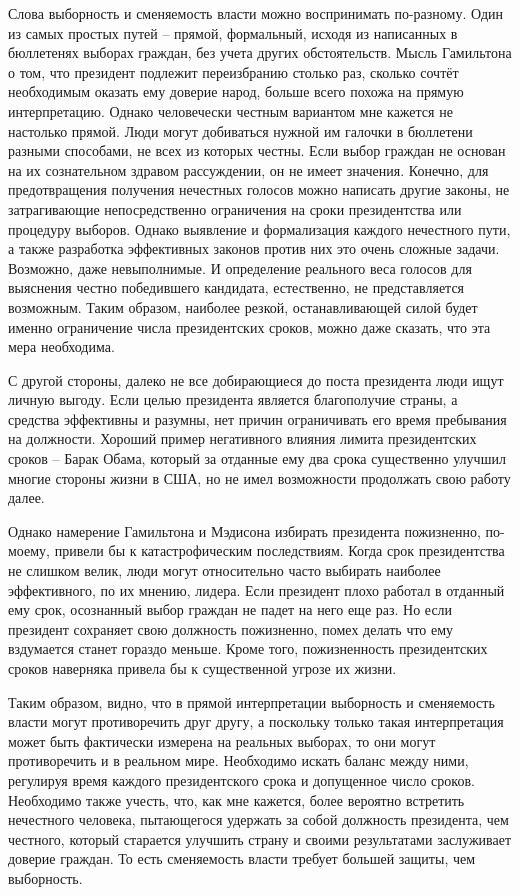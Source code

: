 \documentclass[a4paper, 12pt]{article}
\begin{document}
Слова выборность и сменяемость власти можно воспринимать по-разному. 
Один из самых простых путей -- прямой, формальный, исходя из написанных в бюллетенях выборах граждан, без учета других обстоятельств. 
Мысль Гамильтона о том, что президент подлежит переизбранию столько раз, сколько сочтёт необходимым оказать ему доверие народ, больше всего похожа на прямую интерпретацию. 
Однако человечески честным вариантом мне кажется не настолько прямой. 
Люди могут добиваться нужной им галочки в бюллетени разными способами, не всех из которых честны. 
Если выбор граждан не основан на их сознательном здравом рассуждении, он не имеет значения. 
Конечно, для предотвращения получения нечестных голосов можно написать другие законы, не затрагивающие непосредственно ограничения на сроки президентства или процедуру выборов. 
Однако выявление и формализация каждого нечестного пути, а также разработка эффективных законов против них это очень сложные задачи. 
Возможно, даже невыполнимые. 
И определение реального веса голосов для выяснения честно победившего кандидата, естественно, не представляется возможным. 
Таким образом, наиболее резкой, останавливающей силой будет именно ограничение числа президентских сроков, можно даже сказать, что эта мера необходима. 

С другой стороны, далеко не все добирающиеся до поста президента люди ищут личную выгоду.
Если целью президента является благополучие страны, а средства эффективны и разумны, нет причин ограничивать его время пребывания на должности. 
Хороший пример негативного влияния лимита президентских сроков -- Барак Обама, который за отданные ему два срока существенно улучшил многие стороны жизни в США, но не имел возможности продолжать свою работу далее. 

Однако намерение Гамильтона и Мэдисона избирать президента пожизненно, по-моему, привели бы к катастрофическим последствиям. 
Когда срок президентства не слишком велик, люди могут относительно часто выбирать наиболее эффективного, по их мнению, лидера. 
Если президент плохо работал в отданный ему срок, осознанный выбор граждан не падет на него еще раз. 
Но если президент сохраняет свою должность пожизненно, помех делать что ему вздумается станет гораздо меньше. 
Кроме того, пожизненность президентских сроков наверняка привела бы к существенной угрозе их жизни. 

Таким образом, видно, что в прямой интерпретации выборность и сменяемость власти могут противоречить друг другу, а поскольку только такая интерпретация может быть фактически измерена на реальных выборах, то они могут противоречить и в реальном мире. 
Необходимо искать баланс между ними, регулируя время каждого президентского срока и допущенное число сроков. 
Необходимо также учесть, что, как мне кажется, более вероятно встретить нечестного человека, пытающегося удержать за собой должность президента, чем честного, который старается улучшить страну и своими результатами заслуживает доверие граждан. 
То есть сменяемость власти требует большей защиты, чем выборность. 
\end{document}
